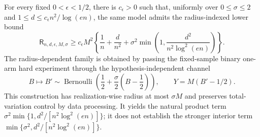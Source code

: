 For every fixed \(0<\epsilon<1/2\), there is \(c_{\epsilon}>0\) such that, uniformly over \(0\le\sigma\le2\) and \(1\le d\le c_{\epsilon}n^2/\log(en)\), the same model admits the radius-indexed lower bound
\[
 \mathsf R_{n,d,\epsilon,M,\sigma}
 \ge c_{\epsilon}M^2\left\{
 \frac1n+\frac d{n^2}+\sigma^2\min\left(1,\frac{d^2}{n^2\log^2(en)}\right)
 \right\}.
\]
The radius-dependent family is obtained by passing the fixed-sample binary one-arm hard experiment through the hypothesis-independent channel
\[
 B\longmapsto B'\sim\operatorname{Bernoulli}\!\left(\frac12+\frac\sigma2\left(B-\frac12\right)\right),
 \qquad Y=M(B'-1/2).
\]
This construction has realization-wise radius at most \(\sigma M\) and preserves total-variation control by data processing.  It yields the natural product term \(\sigma^2\min\{1,d^2/[n^2\log^2(en)]\}\); it does not establish the stronger interior term \(\min\{\sigma^2,d^2/[n^2\log^2(en)]\}\).